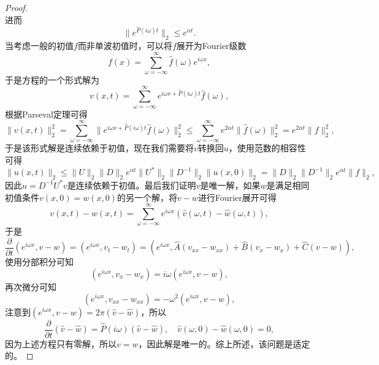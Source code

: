 \documentclass[a4paper,10pt]{ctexart}
\begin{document}
\begin{proof}
\[    \]
    进而
    \[
        \| e^{\hat{P}(i \omega)t} \|_2 \leqslant e^{\alpha t}.
    \]
    当考虑一般的初值$ f $而非单波初值时，可以将$ f $展开为Fourier级数
    \[
        f(x) = \sum_{\omega = -\infty}^{\infty} \hat{f}(\omega)e^{i \omega x},
    \]
    于是方程的一个形式解为
    \[
        v(x,t) = \sum_{\omega = -\infty}^{\infty} e^{i \omega x + \hat{P}(i \omega)t}\hat{f}(\omega),
    \]
    根据Parseval定理可得
    \[
        \| v(x,t) \|_2^2 = \sum_{\omega = -\infty}^{\infty} \| e^{i \omega x + \hat{P}(i \omega)t} \hat{f}(\omega)\|_2^2 \leqslant \sum_{\omega = -\infty}^{\infty} e^{2\alpha t} \| \hat{f}(\omega) \|_2^2 = e^{2\alpha t} \| f \|_2^2,
    \]
    于是该形式解是连续依赖于初值，现在我们需要将$ v $转换回$ u $，使用范数的相容性可得
    \[
        \| u(x,t) \|_2 \leqslant \| U \|_2 \| D \|_2 e^{\alpha t} \| U^* \|_2 \| D^{-1} \|_2 \| u(x,0) \|_2 = \| D \|_2 \| D^{-1} \|_2 e^{\alpha t} \| f \|_2,
    \]
    因此$ u = D^{-1}U^* v $是连续依赖于初值。最后我们证明$ v $是唯一解，如果$ w $是满足相同初值条件$ v(x,0)=w(x,0) $的另一个解，将$ v-w $进行Fourier展开可得
    \[
        v(x,t) - w(x,t) = \sum_{\omega = -\infty}^{\infty} e^{i \omega x}(\hat{v}(\omega,t) - \hat{w}(\omega,t)),
    \]
    于是
    \[
        \dfrac{\partial }{\partial t} (e^{i \omega x}, v-w) = (e^{i \omega x}, v_t-w_t) = (e^{i \omega x}, \hat{A}(v_{xx}-w_{xx}) + \hat{B}(v_x-w_x) + \hat{C}(v-w)),
    \]
    使用分部积分可知
    \[
        (e^{i \omega x}, v_x-w_x) = i \omega (e^{i \omega x}, v-w),
    \]
    再次微分可知
    \[
        (e^{i \omega x}, v_{xx}-w_{xx}) = -\omega^2 (e^{i \omega x}, v-w),
    \]
    注意到$ (e^{i \omega x}, v-w) = 2\pi (\hat{v}-\hat{w}) $，所以
    \[
        \dfrac{\partial }{\partial t} (\hat{v}-\hat{w}) = \hat{P}(i \omega)(\hat{v}-\hat{w}),\quad \hat{v}(\omega,0) - \hat{w}(\omega,0) = 0,
    \]
    因为上述方程只有零解，所以$ v = w $，因此解是唯一的。综上所述，该问题是适定的。
\end{proof}
\end{document}
